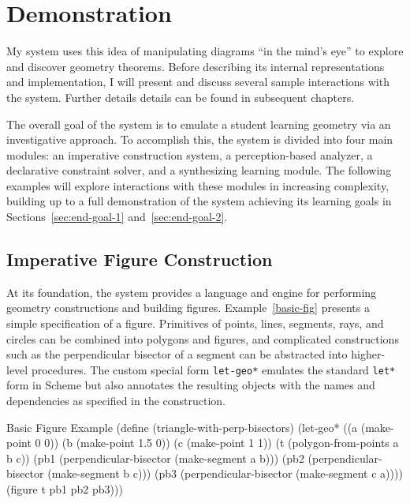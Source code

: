 \chapter{Demonstration}
\label{chap:demo}

My system uses this idea of manipulating diagrams ``in the mind's
eye'' to explore and discover geometry theorems. Before describing its
internal representations and implementation, I will present and
discuss several sample interactions with the system. Further details
details can be found in subsequent chapters.

The overall goal of the system is to emulate a student learning
geometry via an investigative approach. To accomplish this, the system
is divided into four main modules: an imperative construction system,
a perception-based analyzer, a declarative constraint solver, and a
synthesizing learning module.  The following examples will explore
interactions with these modules in increasing complexity, building up
to a full demonstration of the system achieving its learning goals in
Sections~\ref{sec:end-goal-1} and~\ref{sec:end-goal-2}.

\section{Imperative Figure Construction}

\enlargethispage*{\baselineskip}

At its foundation, the system provides a language and engine for
performing geometry constructions and building figures.
Example~\ref{basic-fig} presents a simple specification of a
figure. Primitives of points, lines, segments, rays, and circles can
be combined into polygons and figures, and complicated constructions
such as the perpendicular bisector of a segment can be abstracted into
higher-level procedures. The custom special form \texttt{let-geo*}
emulates the standard \texttt{let*} form in Scheme but also annotates
the resulting objects with the names and dependencies as specified in
the construction.

\pagebreak

\begin{code-example}
[label=basic-fig]
{Basic Figure Example}
(define (triangle-with-perp-bisectors)
  (let-geo* ((a (make-point 0 0))
             (b (make-point 1.5 0))
             (c (make-point 1 1))
             (t (polygon-from-points a b c))
             (pb1 (perpendicular-bisector (make-segment a b)))
             (pb2 (perpendicular-bisector (make-segment b c)))
             (pb3 (perpendicular-bisector (make-segment c a))))
    (figure t pb1 pb2 pb3)))
\end{code-example}

